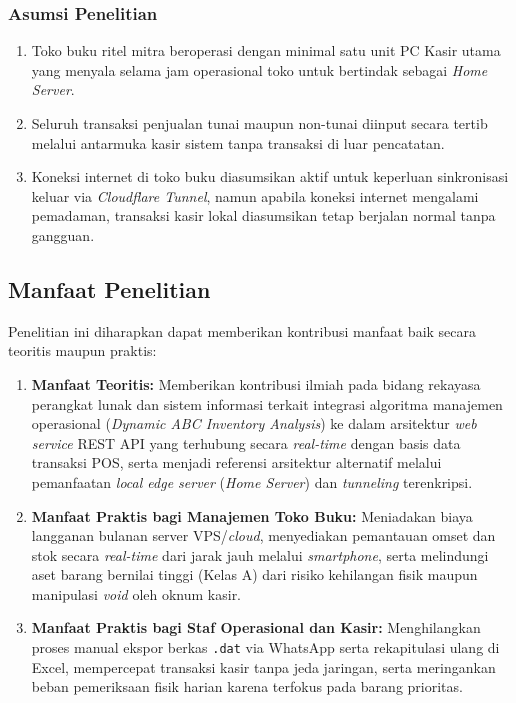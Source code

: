 \documentclass[11pt, a4paper]{article}
\begin{document}
\subsubsection{Asumsi Penelitian}
\begin{enumerate}[label=\alph*.]
    \item Toko buku ritel mitra beroperasi dengan minimal satu unit PC Kasir utama yang menyala selama jam operasional toko untuk bertindak sebagai \textit{Home Server}.
    \item Seluruh transaksi penjualan tunai maupun non-tunai diinput secara tertib melalui antarmuka kasir sistem tanpa transaksi di luar pencatatan.
    \item Koneksi internet di toko buku diasumsikan aktif untuk keperluan sinkronisasi keluar via \textit{Cloudflare Tunnel}, namun apabila koneksi internet mengalami pemadaman, transaksi kasir lokal diasumsikan tetap berjalan normal tanpa gangguan.
\end{enumerate}

\subsection{Manfaat Penelitian}
Penelitian ini diharapkan dapat memberikan kontribusi manfaat baik secara teoritis maupun praktis:
\begin{enumerate}[label=\arabic*.]
    \item \textbf{Manfaat Teoritis:} Memberikan kontribusi ilmiah pada bidang rekayasa perangkat lunak dan sistem informasi terkait integrasi algoritma manajemen operasional (\textit{Dynamic ABC Inventory Analysis}) ke dalam arsitektur \textit{web service} REST API yang terhubung secara \textit{real-time} dengan basis data transaksi POS, serta menjadi referensi arsitektur alternatif melalui pemanfaatan \textit{local edge server} (\textit{Home Server}) dan \textit{tunneling} terenkripsi.
    \item \textbf{Manfaat Praktis bagi Manajemen Toko Buku:} Meniadakan biaya langganan bulanan server VPS/\textit{cloud}, menyediakan pemantauan omset dan stok secara \textit{real-time} dari jarak jauh melalui \textit{smartphone}, serta melindungi aset barang bernilai tinggi (Kelas A) dari risiko kehilangan fisik maupun manipulasi \textit{void} oleh oknum kasir.
    \item \textbf{Manfaat Praktis bagi Staf Operasional dan Kasir:} Menghilangkan proses manual ekspor berkas \texttt{.dat} via WhatsApp serta rekapitulasi ulang di Excel, mempercepat transaksi kasir tanpa jeda jaringan, serta meringankan beban pemeriksaan fisik harian karena terfokus pada barang prioritas.
\end{enumerate}
\end{document}
